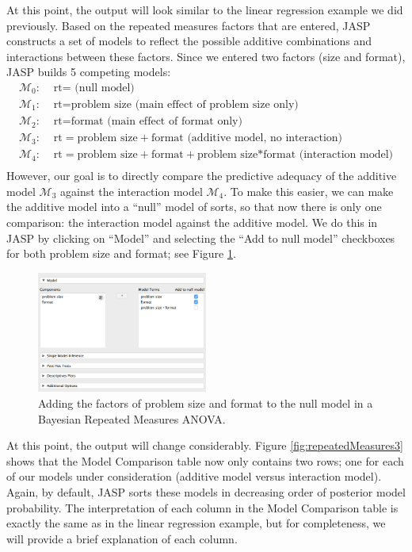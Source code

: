 \documentclass[english,,doc,floatsintext]{apa6}
\begin{document}
At this point, the output will look similar to the linear regression example we did previously. Based on the repeated measures factors that are entered, JASP constructs a set of models to reflect the possible additive combinations and interactions between these factors. Since we entered two factors (size and format), JASP builds 5 competing models:
\begin{align*}
  \mathcal{M}_{0}: & \text{ rt} = \text{ (null model)}\\
  \mathcal{M}_{1}: & \text{ rt} = \text{problem size} \text{ (main effect of problem size only)}\\
  \mathcal{M}_{2}: & \text{ rt} = \text{format} \text{ (main effect of format only)}\\
  \mathcal{M}_{3}: & \text{ rt} = \text{problem size}+\text{format} \text{ (additive model, no interaction)}\\
  \mathcal{M}_{4}: & \text{ rt} = \text{problem size}+\text{format}+\text{problem size*format} \text{ (interaction model)}\\
\end{align*}
However, our goal is to directly compare the predictive adequacy of the additive model \(\mathcal{M}_3\) against the interaction model \(\mathcal{M}_4\). To make this easier, we can make the additive model into a \enquote{null} model of sorts, so that now there is only one comparison: the interaction model against the additive model. We do this in JASP by clicking on \enquote{Model} and selecting the \enquote{Add to null model} checkboxes for both problem size and format; see Figure \ref{fig:repeatedMeasures2}.

\begin{figure}[htbp]
\centering
\includegraphics[width=0.5\textwidth,height=\textheight]{figures/repeatedMeasures2.png}
\caption{\label{fig:repeatedMeasures2}Adding the factors of problem size and format to the null model in a Bayesian Repeated Measures ANOVA.}
\end{figure}

At this point, the output will change considerably. Figure \ref{fig:repeatedMeasures3} shows that the Model Comparison table now only contains two rows; one for each of our models under consideration (additive model versus interaction model). Again, by default, JASP sorts these models in decreasing order of posterior model probability. The interpretation of each column in the Model Comparison table is exactly the same as in the linear regression example, but for completeness, we will provide a brief explanation of each column.
\end{document}
